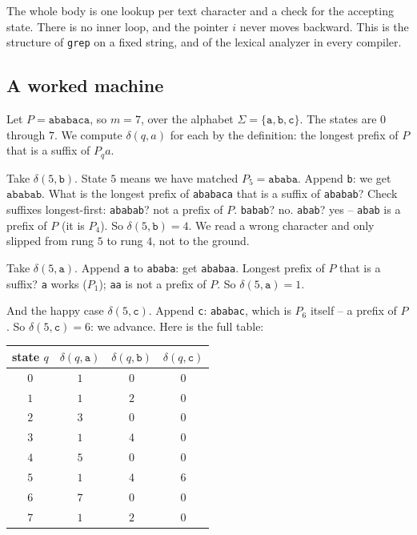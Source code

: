 The whole body is one lookup per text character and a check for the accepting
state. There is no inner loop, and the pointer $i$ never moves backward. This is
the structure of \texttt{grep} on a fixed string, and of the lexical analyzer in
every compiler.

\subsection{A worked machine}

Let $P = \texttt{ababaca}$, so $m = 7$, over the alphabet
$\Sigma = \{\texttt{a}, \texttt{b}, \texttt{c}\}$. The states are $0$ through
$7$. We compute $\delta(q,a)$ for each by the definition: the longest prefix of
$P$ that is a suffix of $P_q a$.

Take $\delta(5, \texttt{b})$. State $5$ means we have matched
$P_5 = \texttt{ababa}$. Append \texttt{b}: we get $\texttt{ababab}$. What is the
longest prefix of \texttt{ababaca} that is a suffix of \texttt{ababab}? Check
suffixes longest-first: \texttt{ababab}? not a prefix of $P$.
\texttt{babab}? no. \texttt{abab}? yes -- \texttt{abab} is a prefix of $P$
(it is $P_4$). So $\delta(5, \texttt{b}) = 4$. We read a wrong character and only
slipped from rung $5$ to rung $4$, not to the ground.

Take $\delta(5, \texttt{a})$. Append \texttt{a} to \texttt{ababa}: get
\texttt{ababaa}. Longest prefix of $P$ that is a suffix? \texttt{a} works
($P_1$); \texttt{aa} is not a prefix of $P$. So $\delta(5, \texttt{a}) = 1$.

And the happy case $\delta(5, \texttt{c})$. Append \texttt{c}: \texttt{ababac},
which is $P_6$ itself -- a prefix of $P$. So $\delta(5, \texttt{c}) = 6$: we
advance. Here is the full table:

\begin{center}
\begin{tabular}{c|ccc}
\toprule
state $q$ & $\delta(q,\texttt{a})$ & $\delta(q,\texttt{b})$ & $\delta(q,\texttt{c})$ \\
\midrule
$0$ & $1$ & $0$ & $0$ \\
$1$ & $1$ & $2$ & $0$ \\
$2$ & $3$ & $0$ & $0$ \\
$3$ & $1$ & $4$ & $0$ \\
$4$ & $5$ & $0$ & $0$ \\
$5$ & $1$ & $4$ & $6$ \\
$6$ & $7$ & $0$ & $0$ \\
$7$ & $1$ & $2$ & $0$ \\
\bottomrule
\end{tabular}
\end{center}

